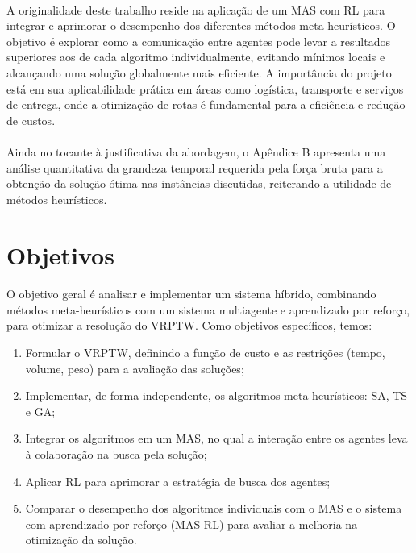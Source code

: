 \paragraph{}A originalidade deste trabalho reside na aplicação de um MAS com RL para integrar e aprimorar o desempenho dos diferentes métodos meta-heurísticos. O objetivo é explorar como a comunicação entre agentes pode levar a resultados superiores aos de cada algoritmo individualmente, evitando mínimos locais e alcançando uma solução globalmente mais eficiente. A importância do projeto está em sua aplicabilidade prática em áreas como logística, transporte e serviços de entrega, onde a otimização de rotas é fundamental para a eficiência e redução de custos.

\paragraph{}Ainda no tocante à justificativa da abordagem, o Apêndice B apresenta uma análise quantitativa da grandeza temporal requerida pela força bruta para a obtenção da solução ótima nas instâncias discutidas, reiterando a utilidade de métodos heurísticos.

\section{Objetivos}
\label{sec:objetivos}

\paragraph{}O objetivo geral é analisar e implementar um sistema híbrido, combinando métodos meta-heurísticos com um sistema multiagente e aprendizado por reforço, para otimizar a resolução do VRPTW. Como objetivos específicos, temos:

\begin{enumerate}
    \item Formular o VRPTW, definindo a função de custo e as restrições (tempo, volume, peso) para a avaliação das soluções;
    \item Implementar, de forma independente, os algoritmos meta-heurísticos: SA, TS e GA;
    \item Integrar os algoritmos em um MAS, no qual a interação entre os agentes leva à colaboração na busca pela solução;
    \item Aplicar RL para aprimorar a estratégia de busca dos agentes;
    \item Comparar o desempenho dos algoritmos individuais com o MAS e o sistema com aprendizado por reforço (MAS-RL) para avaliar a melhoria na otimização da solução.
\end{enumerate}

